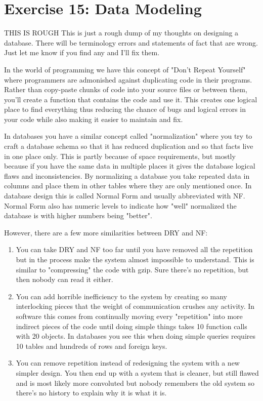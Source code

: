 \chapter{Exercise 15: Data Modeling}

\begin{note}{THIS IS ROUGH}
This is just a rough dump of my thoughts on designing a database.  There will be
terminology errors and statements of fact that are wrong.  Just let me know if you
find any and I'll fix them.
\end{note}

In the world of programming we have this concept of "Don't Repeat Yourself" where programmers
are admonished against duplicating code in their programs.  Rather than copy-paste chunks of
code into your source files or between them, you'll create a function that contains the code
and use it.  This creates one logical place to find everything thus reducing the chance of
bugs and logical errors in your code while also making it easier to maintain and fix.

In databases you have a similar concept called "normalization" where you try to
craft a database schema so that it has reduced duplication and so that facts
live in one place only.  This is partly because of space requirements, but
mostly because if you have the same data in multiple places it gives the
database logical flaws and inconsistencies.  By normalizing a database you take
repeated data in columns and place them in other tables where they are only mentioned
once.  In database design this is called Normal Form and usually abbreviated with
NF.  Normal Form also has numeric levels to indicate how "well" normalized the
database is with higher numbers being "better".


However, there are a few more similarities between DRY and NF:

\begin{enumerate}
\item You can take DRY and NF too far until you have removed all the repetition
    but in the process make the system almost impossible to understand.  This is similar
    to "compressing" the code with gzip.  Sure there's no repetition, but then nobody can
    read it either.
\item You can add horrible inefficiency to the system by creating so many interlocking pieces
    that the weight of communication crushes any activity.  In software this comes from
    continually moving every "repetition" into more indirect pieces of the code until doing
    simple things takes 10 function calls with 20 objects.  In databases you see this when
    doing simple queries requires 10 tables and hundreds of rows and foreign keys.
\item You can remove repetition instead of redesigning the system with a new simpler design.
    You then end up with a system that is cleaner, but still flawed and is most likely more
    convoluted but nobody remembers the old system so there's no history to explain why
    it is what it is.
\end{enumerate}


